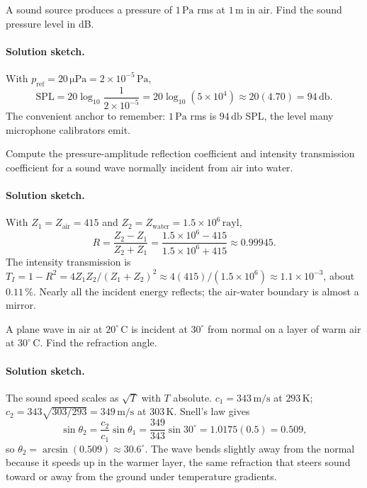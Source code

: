 \begin{exercise}
A sound source produces a pressure of $1\,\si{\pascal}$ rms at $1\,\si
{\meter}$ in air. Find the sound pressure level in dB.
\paragraph{Solution sketch.} With $p_{\text{ref}} = 20\,\si{
\micro\pascal} = 2\times 10^{-5}\,\si{\pascal}$,
\[
\text{SPL} = 20\log_{10}\!\frac{1}{2\times 10^{-5}}
= 20\log_{10}(5\times 10^{4}) \approx 20(4.70) = 94\,\si{\decibel}.
\]
The convenient anchor to remember: $1\,\si{\pascal}$ rms is
$94\,\si{\decibel}$ SPL, the level many microphone calibrators emit.
\end{exercise}

\begin{exercise}
Compute the pressure-amplitude reflection coefficient and intensity
transmission coefficient for a sound wave normally incident from
air into water.
\paragraph{Solution sketch.} With $Z_1 = Z_{\text{air}} = 415$ and
$Z_2 = Z_{\text{water}} = 1.5\times 10^{6}\,\text{rayl}$,
\[
R = \frac{Z_2 - Z_1}{Z_2 + Z_1}
= \frac{1.5\times 10^{6} - 415}{1.5\times 10^{6} + 415}
\approx 0.99945.
\]
The intensity transmission is
$T_I = 1 - R^2 = 4Z_1 Z_2/(Z_1+Z_2)^2 \approx 4(415)/(1.5\times
10^{6}) \approx 1.1\times 10^{-3}$, about $0.11\,\%$. Nearly all the
incident energy reflects; the air-water boundary is almost a mirror.
\end{exercise}

\begin{exercise}
A plane wave in air at $20^{\circ}\,\mathrm{C}$ is incident at
$30^{\circ}$ from normal on a layer of warm air at $30^{\circ}\,
\mathrm{C}$. Find the refraction angle.
\paragraph{Solution sketch.} The sound speed scales as $\sqrt{T}$ with
$T$ absolute. $c_1 = 343\,\si{\meter\per\second}$ at $293\,\si{\kelvin}$;
$c_2 = 343\sqrt{303/293} = 349\,\si{\meter\per\second}$ at
$303\,\si{\kelvin}$. Snell's law gives
\[
\sin\theta_2 = \frac{c_2}{c_1}\sin\theta_1
= \frac{349}{343}\sin 30^{\circ} = 1.0175(0.5) = 0.509,
\]
so $\theta_2 = \arcsin(0.509) \approx 30.6^{\circ}$. The wave bends
slightly away from the normal because it speeds up in the warmer
layer, the same refraction that steers sound toward or away from the
ground under temperature gradients.
\end{exercise}

